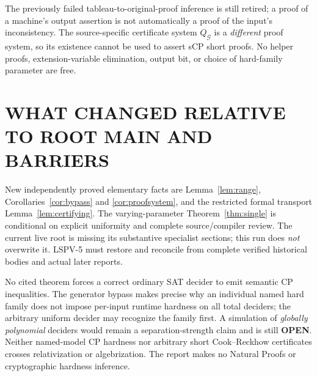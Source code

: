 \documentclass[11pt]{article}
\newcommand{\OPEN}{\textbf{OPEN}}
\begin{document}
The previously failed tableau-to-original-proof inference
is still retired; a proof of a machine's output assertion is
not automatically a proof of the input's inconsistency.
The source-specific certificate system $Q_{\mathcal G}$
is a \emph{different} proof system, so its existence cannot
be used to assert sCP short proofs. No helper proofs,
extension-variable elimination, output bit, or choice of
hard-family parameter are free.

\section{WHAT CHANGED RELATIVE TO ROOT MAIN AND BARRIERS}
New independently proved elementary facts are
Lemma~\ref{lem:range}, Corollaries~\ref{cor:bypass} and
\ref{cor:proofsystem}, and the restricted formal transport
Lemma~\ref{lem:certifying}. The varying-parameter
Theorem~\ref{thm:single} is conditional on explicit
uniformity and complete source/compiler review.
The current live root is missing its substantive specialist
sections; this run does \emph{not} overwrite it.
LSPV-5 must restore and reconcile from complete verified
historical bodies and actual later reports.

No cited theorem forces a correct ordinary SAT decider to
emit semantic CP inequalities. The generator bypass makes
precise why an individual named hard family does not impose
per-input runtime hardness on all total deciders; the arbitrary
uniform decider may recognize the family first. A simulation
of \emph{globally polynomial} deciders would remain a
separation-strength claim and is still \OPEN{}.
Neither named-model CP hardness nor arbitrary short
Cook--Reckhow certificates crosses relativization or
algebrization. The report makes no Natural Proofs or
cryptographic hardness inference.
\end{document}
